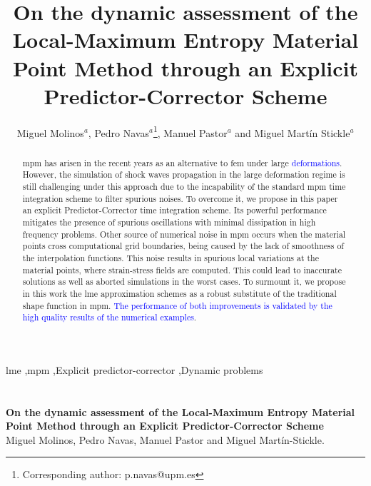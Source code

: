 \documentclass[preprint,12pt,a4paper]{elsarticle}
\begin{document}
 

\begin{frontmatter}

\title{On the dynamic assessment of the Local-Maximum Entropy Material Point Method through an Explicit Predictor-Corrector Scheme}

\author{
Miguel Molinos$^a$,
Pedro Navas$^a$\footnote{Corresponding author: p.navas@upm.es},
Manuel Pastor$^a$
and Miguel Mart\'in Stickle$^a$}
\address{
  $^a$ ETSI Caminos, Canales y Puertos, Universidad Polit\'ectnica de Madrid.\\ c. Prof. Aranguren 3, 28040 Madrid, Spain
}

\begin{abstract}
  \acrfull{mpm} has arisen in the recent years as an alternative to \acrfull{fem} under large
  \textcolor{blue}{deformations}. However, the simulation of shock waves
  propagation in the large deformation regime is still challenging  under this approach due to the incapability of the standard \acrshort{mpm} time
  integration scheme to filter spurious noises. To overcome it, we propose in this paper an explicit Predictor-Corrector time
    integration scheme. Its powerful performance mitigates the
  presence of spurious oscillations with minimal dissipation in high
  frequency problems. Other source of numerical noise in
  \acrshort{mpm} occurs when the material points cross computational grid boundaries, being caused by
  the lack of smoothness of the interpolation functions. This noise
  results in spurious local variations at the material points, where
  strain-stress fields are computed. This could lead to inaccurate
  solutions as well as aborted simulations in the worst cases. To
  surmount it, we propose in this work the \acrfull{lme} approximation
  schemes as a robust substitute of the traditional shape function in
  \acrshort{mpm}. \textcolor{blue}{The performance of both improvements is validated by the high quality
   results of the numerical examples}.
\end{abstract}

\begin{keyword}
  \acrshort{lme} \sep \acrshort{mpm} \sep Explicit predictor-corrector \sep Dynamic problems
\end{keyword}

\section*{}
\centering
\Large
\textbf{On the dynamic assessment of the Local-Maximum Entropy Material Point Method through an Explicit Predictor-Corrector Scheme}\\
\setlength{\parskip}{1cm plus 5mm minus 4mm}
Miguel Molinos, Pedro Navas, Manuel Pastor and Miguel Mart\'in-Stickle.


\end{frontmatter}
\end{document}
